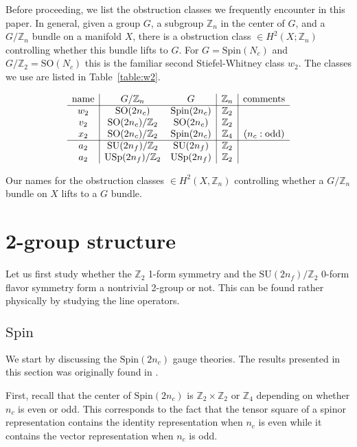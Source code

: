 \documentclass[12pt]{article}
\numberwithin{equation}{section}
\def\bZ{\mathbb{Z}}
\def\SU{\mathrm{SU}}
\def\SO{\mathrm{SO}}
\def\USp{\mathrm{USp}}
\def\Spin{\mathrm{Spin}}
\begin{document}
Before proceeding, we list the obstruction classes we frequently encounter in this paper.
In general, given a group $G$, a subgroup $\bZ_n$ in the center of $G$,
and a $G/\bZ_n$ bundle on a manifold $X$, 
there is a obstruction class $\in H^2(X; \bZ_n)$ controlling whether this bundle lifts to $G$.
For $G=\Spin(N_c)$ and $G/\bZ_2=\SO(N_c)$ this is the familiar second Stiefel-Whitney class $w_2$.
The classes we use are listed in Table~\ref{table:w2}.

\begin{table}
\[
\begin{array}{c| cc| c|c}
\text{name} & G/\bZ_n & G & \bZ_n & \text{comments}\\
\hline 
w_2 & \SO(2n_c) & \Spin(2n_c) & \bZ_2\\
v_2 & \SO(2n_c)/\bZ_2 & \SO(2n_c) &\bZ_2\\
x_2 & \SO(2n_c)/\bZ_2 & \Spin(2n_c) &\bZ_4 & (n_c:\text{odd})\\
\hline
a_2 & \SU(2n_f)/\bZ_2 & \SU(2n_f) &\bZ_2\\
a_2 & \USp(2n_f)/\bZ_2 & \USp(2n_f) &\bZ_2\\
\end{array}
\]
\caption{Our names for the obstruction classes $\in H^2(X,\bZ_n)$ controlling whether a $G/\bZ_n$ bundle
on $X$ lifts to a $G$ bundle.  \label{table:w2}}
\end{table}


\section{2-group structure}
\label{sec:2-group}
Let us first study whether the $\bZ_2$ 1-form symmetry and the $\SU(2n_f)/\bZ_2$ 0-form flavor symmetry form a nontrivial 2-group or not. 
This can be found rather physically by studying the line operators. 

\subsection{$\Spin$}
We start by discussing the $\Spin(2n_c)$ gauge theories. 
The results presented in this section was originally found in \cite[Sec.~4.4]{Hsin:2020nts}.

First, recall that the center of $\Spin(2n_c)$ is $\bZ_2\times \bZ_2$ or $\bZ_4$ depending on whether $n_c$ is even or odd.
This corresponds to the fact that the tensor square of a spinor representation contains the identity representation when $n_c$ is even while it contains the vector representation when $n_c$ is odd.
\end{document}

